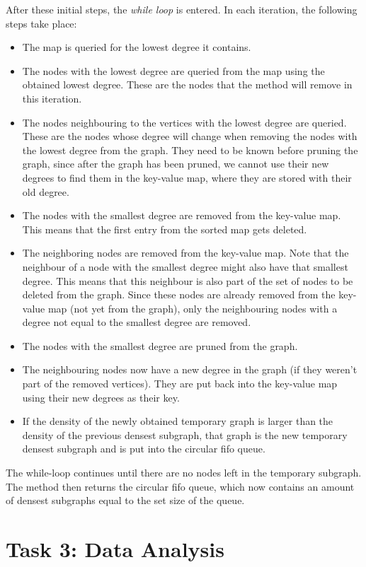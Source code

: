 \documentclass[10pt,a4paper]{article}
\begin{document}
After these initial steps, the \emph{while loop} is entered. In each iteration, the following steps take place:
\begin{itemize}
\item The map is queried for the lowest degree it contains.
\item The nodes with the lowest degree are queried from the map using the obtained lowest degree. These are the nodes that the method will remove in this iteration.
\item The nodes neighbouring to the vertices with the lowest degree are queried. These are the nodes whose degree will change when removing the nodes with the lowest degree from the graph. They need to be known before pruning the graph, since after the graph has been pruned, we cannot use their new degrees to find them in the key-value map, where they are stored with their old degree.
\item The nodes with the smallest degree are removed from the key-value map. This means that the first entry from the sorted map gets deleted.
\item The neighboring nodes are removed from the key-value map. Note that the neighbour of a node with the smallest degree might also have that smallest degree. This means that this neighbour is also part of the set of nodes to be deleted from the graph. Since these nodes are already removed from the key-value map (not yet from the graph), only the neighbouring nodes with a degree not equal to the smallest degree are removed.
\item The nodes with the smallest degree are pruned from the graph.
\item The neighbouring nodes now have a new degree in the graph (if they weren't part of the removed vertices). They are put back into the key-value map using their new degrees as their key.
\item If the density of the newly obtained temporary graph is larger than the density of the previous densest subgraph, that graph is the new temporary densest subgraph and is put into the circular fifo queue.
\end{itemize}
The while-loop continues until there are no nodes left in the temporary subgraph. The method then returns the circular fifo queue, which now contains an amount of densest subgraphs equal to the set size of the queue.


\section{Task 3: Data Analysis}
\end{document}
